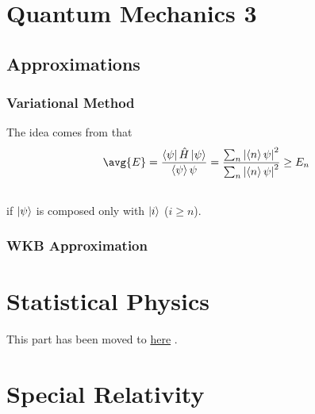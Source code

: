 \documentclass[letterpaper,10pt,english]{sphinxmanual}
\begin{document}
{\section{Quantum Mechanics 3}
\label{QuantumMechanics3:quantum-mechanics-3}\label{QuantumMechanics3::doc}

\subsection{Approximations}
\label{QuantumMechanics3:approximations}

\subsubsection{Variational Method}
\label{QuantumMechanics3:variational-method}
The idea comes from that
\begin{gather}
\begin{split}\avg{E} = \frac{\bra{\psi}\hat H\ket{\psi}}{\braket{\psi}{\psi}} = \frac{\sum_n \left| \braket{n}{\psi}  \right|^2}{\sum_n \left| \braket{n}{\psi} \right|^2} \geq E_n\end{split}\notag\\\begin{split}\end{split}\notag
\end{gather}
if $\ket{\psi}$ is composed only with $\ket{i}$ ($i\geq n$).


\subsubsection{WKB Approximation}
\label{QuantumMechanics3:wkb-approximation}

\section{Statistical Physics}
\label{StatisticalPhysics::doc}\label{StatisticalPhysics:statistical-physics}
This part has been moved to \href{http://emptymalei.github.io/StatisticalPhysics/}{here} .


\section{Special Relativity}
\label{SpecialRelativity::doc}\label{SpecialRelativity:special-relativity}

}
\end{document}
